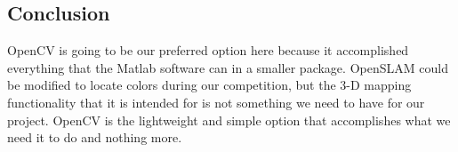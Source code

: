 \documentclass[letterpaper, 10, draftclsnofoot, onecolumn, compsoc]{IEEEtran}
\begin{document}
\subsection{Conclusion}

OpenCV is going to be our preferred option here because it 
accomplished everything that the Matlab software can in a smaller 
package. OpenSLAM could be modified to locate colors during our 
competition, but the 3-D mapping functionality that it is intended 
for is not something we need to have for our project. OpenCV is the 
lightweight and simple option that accomplishes what we need it to 
do and nothing more. 

\vspace{2mm}



\end{document}
